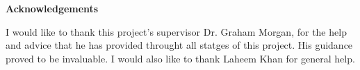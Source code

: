 \thispagestyle{plain}
\begin{center}
  \textbf{Acknowledgements}
\end{center}
I would like to thank this project's supervisor Dr. Graham Morgan, for the help and advice that he has provided throught all statges of this project. His guidance proved to be invaluable. I would also like to thank Laheem Khan for general help.
